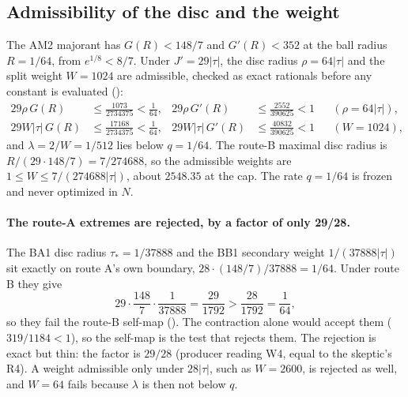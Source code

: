 \subsection{Admissibility of the disc and the weight}
\label{sec:bc2-admissible}
The AM2 majorant has $G(R)<148/7$ and $G'(R)<352$ at the ball radius
$R=1/64$, from $e^{1/8}<8/7$. Under $J'=29|\tau|$, the disc radius
$\rho=64|\tau|$ and the split weight $W=1024$ are admissible, checked as exact
rationals before any constant is evaluated
():
\begin{equation}
 \begin{aligned}
 29\rho\,G(R)&\le\frac{1073}{2734375}<\frac1{64}, &
 29\rho\,G'(R)&\le\frac{2552}{390625}<1 &&(\rho=64|\tau|),\\
 29W|\tau|\,G(R)&\le\frac{17168}{2734375}<\frac1{64}, &
 29W|\tau|\,G'(R)&\le\frac{40832}{390625}<1 &&(W=1024),
 \end{aligned}
 \label{eq:bc2-admissible}
\end{equation}
and $\lambda=2/W=1/512$ lies below $q=1/64$. The route-B maximal disc radius
is $R/(29\cdot148/7)=7/274688$, so the admissible weights are
$1\le W\le7/(274688|\tau|)$, about $2548.35$ at the cap. The rate $q=1/64$ is
frozen and never optimized in $N$.

\paragraph{The route-A extremes are rejected, by a factor of only 29/28.} The
BA1 disc radius $\tau_*=1/37888$ and the BB1 secondary weight
$1/(37888|\tau|)$ sit exactly on route A's own boundary,
$28\cdot(148/7)/37888=1/64$. Under route B they give
\begin{equation}
 29\cdot\frac{148}{7}\cdot\frac1{37888}=\frac{29}{1792}>\frac{28}{1792}=\frac1{64},
 \label{eq:bc2-route-a}
\end{equation}
so they fail the route-B self-map (). The contraction
alone would accept them ($319/1184<1$), so the self-map is the test that
rejects them. The rejection is exact but thin: the factor is $29/28$
(producer reading W4, equal to the skeptic's R4). A weight admissible only
under $28|\tau|$, such as $W=2600$, is rejected as well, and $W=64$ fails
because $\lambda$ is then not below $q$.


